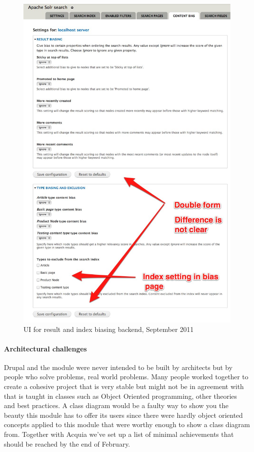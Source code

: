 \begin{figure}[H]
     \includegraphics[width=\textwidth/(2)]{images/apachesolr_ui_backend_september_2011_4.jpg}
     \caption{UI for result and index biasing backend, September 2011}
\end{figure}

\paragraph{Architectural challenges}
Drupal and the module were never intended to be built by architects but by people who solve problems, real world problems. Many people worked together to create a cohesive project that is very stable but might not be in agreement with that is taught in classes such as Object Oriented programming, other theories and best practices. A class diagram would be a faulty way to show you the beauty this module has to offer its users since there were hardly object oriented concepts applied to this module that were worthy enough to show a class diagram from. Together with Acquia we've set up a list of minimal achievements that should be reached by the end of  February. 

